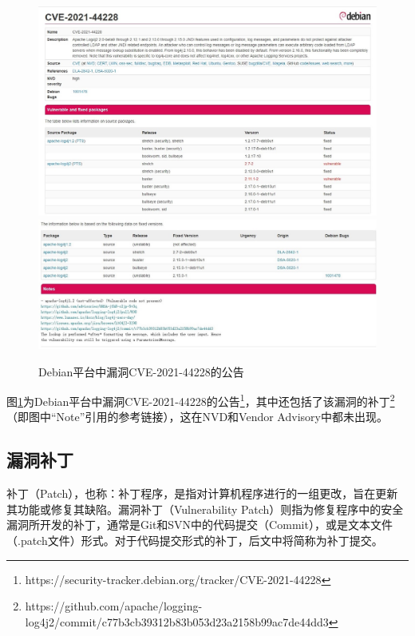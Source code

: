 

\begin{figure}[!t]
    \centering
    \includegraphics[width=1.0\textwidth]{fig/debian-2021-44228}
    \includegraphics[width=1.0\textwidth]{fig/debian-2021-44228-2}
    \caption{Debian平台中漏洞CVE-2021-44228的公告}
    \label{fig:debian-2021-44228}
\end{figure}
图\ref{fig:debian-2021-44228}为Debian平台中漏洞CVE-2021-44228的公告\footnote{https://security-tracker.debian.org/tracker/CVE-2021-44228}，其中还包括了该漏洞的补丁\footnote{https://github.com/apache/logging-log4j2/commit/c77b3cb39312b83b053d23a2158b99ac7de44dd3}（即图中“Note”引用的参考链接），这在NVD和Vendor Advisory中都未出现。


\subsection{漏洞补丁}
补丁（Patch），也称：补丁程序，是指对计算机程序进行的一组更改，旨在更新其功能或修复其缺陷。漏洞补丁（Vulnerability Patch）则指为修复程序中的安全漏洞所开发的补丁，通常是Git和SVN中的代码提交（Commit），或是文本文件（.patch文件）形式。对于代码提交形式的补丁，后文中将简称为补丁提交。


